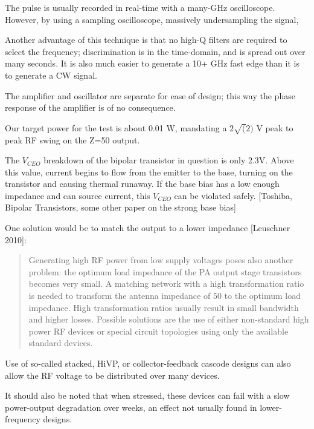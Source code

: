 \documentclass[paper.tex]{subfiles}
\begin{document}
The pulse is usually recorded in real-time with a many-GHz oscilloscope. However, by using a sampling oscilloscope, massively undersampling the signal,

Another advantage of this technique is that no high-Q filters are required to select the frequency;
discrimination is in the time-domain, and is spread out over many seconds. It is also much easier to generate a 10+ GHz fast edge than it is to generate a CW signal.




The amplifier and oscillator are separate for ease of design; this way the phase response of the amplifier is of no consequence. 

Our target power for the test is about 0.01 W, mandating a $2 \sqrt(2)$ V peak to peak RF swing on the Z=50 output.

The $V_{CEO}$ breakdown of the bipolar transistor in question is only 2.3V. Above this value, current begins to flow from the emitter to the base, turning on the transistor and causing thermal runaway. If the base bias has a low enough impedance and can source current, this $V_{CEO}$ can be violated safely. [Toshiba, Bipolar Transistors, some other paper on the strong base bias]

One solution would be to match the output to a lower impedance [Leuschner 2010]:

\begin{quote}
Generating high RF power from low supply voltages poses also another problem: the optimum load impedance of the PA output stage transistors becomes very small. A matching network with a high transformation ratio is needed to transform the antenna impedance of 50 to the optimum load impedance. High transformation ratios usually result in small bandwidth and higher losses. Possible solutions are the use of either non-standard high power RF devices or special circuit topologies using only the available standard devices.
\end{quote}



Use of so-called stacked, HiVP, or collector-feedback cascode designs can also allow the RF voltage to be distributed over many devices.

It should also be noted that when stressed, these devices can fail with a slow power-output degradation over weeks, an effect not usually found in lower-frequency designs. 

\printbibliography[heading=none, title={}, keyword={amplifier}]
\end{document}
